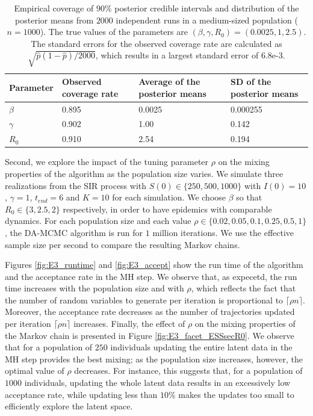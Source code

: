 \documentclass[11pt]{article}
\begin{document}
    \begin{table}
    \centering
    \begin{tabular}{ C{2cm}| *{3}{C{3cm}}}
        Parameter & Observed coverage rate & Average of the posterior means & SD of the posterior means \\ 
        \hline
        $\beta$ & 0.895 & 0.0025 & 0.000255 \\ 
        $\gamma$ & 0.902 & 1.00 & 0.142 \\ 
        $R_0$ & 0.910 & 2.54 & 0.194 \\
        \hline
    \end{tabular}
    \caption{Empirical coverage of $90\%$ posterior credible intervals and distribution of the posterior means from $2000$ independent runs in a medium-sized population ($n=1000$). The true values of the parameters are $(\beta, \gamma, R_0) = (0.0025, 1, 2.5)$. The standard errors for the observed coverage rate are calculated as $\sqrt{\hat{p}(1-\hat{p})/2000}$, which results in a largest standard error of $6.8$e-3.}
    \label{tab:coverage}
    \end{table}
	
	Second, we explore the impact of the tuning parameter $\rho$ on the mixing properties of the algorithm as the population size varies.
	We simulate three realizations from the SIR process with $S(0) \in \{250, 500, 1000\}$ with  $I(0)=10$, $\gamma=1$, $t_{end} = 6$ and $K = 10$ for each simulation. We choose $\beta$ so that $R_0 \in \{3, 2.5, 2\}$ respectively, in order to have epidemics with comparable dynamics. For each population size and each value $\rho \in \{0.02, 0.05, 0.1, 0.25, 0.5, 1\}$, the DA-MCMC algorithm is run for $1$ million iterations. We use the effective sample size per second to compare the resulting Markov chains.
	
	Figures \ref{fig:E3_runtime} and \ref{fig:E3_accept} show the run time of the algorithm and the acceptance rate in the MH step. We observe that, as expecetd, the run time increases with the population size and with $\rho$, which reflects the fact that the number of random variables to generate per iteration is proportional to $\lceil\rho n\rceil$. Moreover, the acceptance rate decreases as the number of trajectories updated per iteration $\lceil\rho n\rceil$ increases.
	Finally, the effect of $\rho$ on the mixing properties of the Markov chain is presented in Figure \ref{fig:E3_facet_ESSsecR0}. We observe that for a population of $250$ individuals updating the entire latent data in the MH step provides the best mixing; as the population size increases, however, the optimal value of $\rho$ decreases. For instance, this suggests that, for a population of $1000$ individuals, updating the whole latent data results in an excessively low acceptance rate, while updating less than $10$\% makes the updates too small to efficiently explore the latent space.
	
\end{document}
